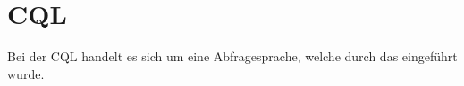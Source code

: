 \section{\acl{CQL}}

Bei der \ac{CQL} handelt es sich um eine Abfragesprache, welche durch das
 eingeführt wurde.
